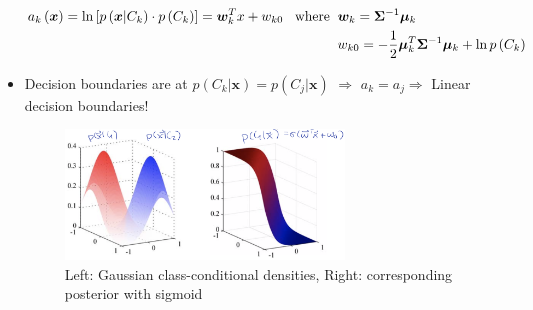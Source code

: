 \begin{itemize}
	\begin{equation*}
	\begin{split}
	a_k\left(\bm{x}\right) = \ln \left[p\left(\bm{x}|C_k\right)\cdot p\left(C_k\right)\right]=\bm{w}_k^Tx+w_{k0} \text{\hspace{3mm}where\hspace{2mm}} & \bm{w}_k = \bm{\Sigma}^{-1}\bm{\mu}_k\\
	& w_{k0} = -\frac{1}{2}\bm{\mu}_k^T\bm{\Sigma}^{-1}\bm{\mu}_k + \ln p\left(C_k\right)
	\end{split}
	\end{equation*} 
	\item Decision boundaries are at $p\left(C_k|\bm{x}\right) = p\left(C_j|\bm{x}\right)$ $\Rightarrow$ $a_k = a_j\Rightarrow$ Linear decision boundaries!
	\begin{figure}[ht]
		\centering
		\includegraphics[width=0.7\textwidth]{figures/linear_classification_pgm.png}
		\caption{Left: Gaussian class-conditional densities, Right: corresponding posterior with sigmoid}
	\end{figure}
\end{itemize}
